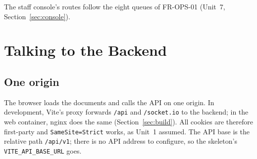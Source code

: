 \documentclass[11pt,a4paper]{article}
\begin{document}
The staff console's routes follow the eight queues of FR-OPS-01 (Unit~7, Section~\ref{sec:console}).
\section{Talking to the Backend}
\label{sec:client}

\subsection{One origin}
The browser loads the documents and calls the API on one origin. In development, Vite's proxy forwards \texttt{/api} and \texttt{/socket.io} to the backend; in the web container, nginx does the same (Section~\ref{sec:build}). All cookies are therefore first-party and \texttt{SameSite=Strict} works, as Unit~1 assumed. The API base is the relative path \texttt{/api/v1}; there is no API address to configure, so the skeleton's \texttt{VITE\_API\_BASE\_URL} goes.
\end{document}
